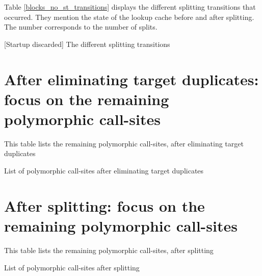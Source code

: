 \documentclass[preprint]{acmart}
\let\NoStartupBlocksSplittingTransitions\BlocksSplittingTransitions
\begin{document}
Table \ref{blocks_no_st_transitions} displays the different splitting transitions that occurred. They mention the state of the lookup cache before and after splitting. The number corresponds to the number of splits.

\begin{table}[h!]
	\centering
	\NoStartupBlocksSplittingTransitions
	\caption{[Startup discarded] The different splitting transitions}
	\label{blocks_no_st_transitions}
\end{table}

\clearpage
\appendix
\section{After eliminating target duplicates: focus on the remaining polymorphic call-sites}
\label{aftertp}

This table lists the remaining polymorphic call-sites, after eliminating target duplicates

\begin{table}[h!]
	\centering
	\resizebox{\linewidth}{!}{
	\PolyAfterTP
	}
	\caption{List of polymorphic call-sites after eliminating target duplicates}
\end{table}


\section{After splitting: focus on the remaining polymorphic call-sites}
\label{aftersplitting}

This table lists the remaining polymorphic call-sites, after splitting

\begin{table}[h!]
	\centering
	\resizebox{\linewidth}{!}{
	\PolyAfterSplitting
	}
	\caption{List of polymorphic call-sites after splitting}
\end{table}
\end{document}
